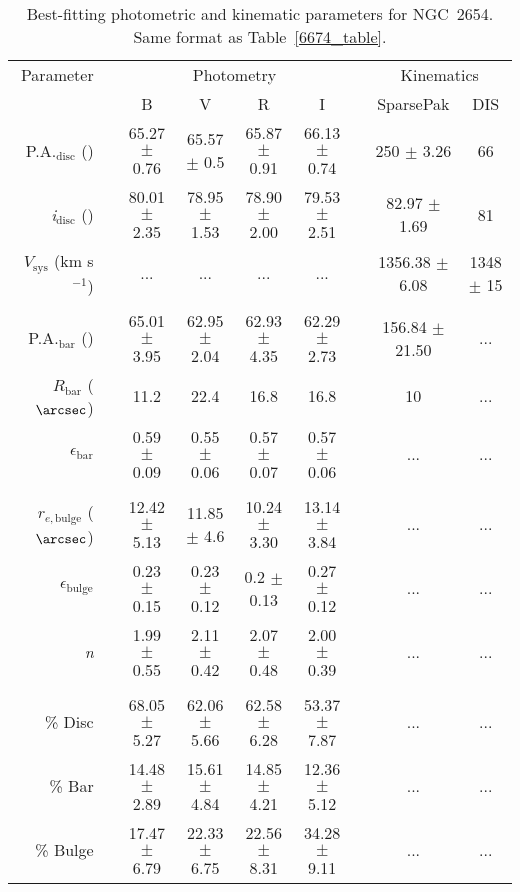 \documentclass[a4paper,fleqn,usenatbib]{mnras}
\begin{document}
\begin{table*}
	\centering
	\caption{Best-fitting photometric and kinematic parameters for NGC~2654. Same format as Table~\ref{6674_table}.}
	\label{2654_table}
	\begin{tabular}{rcccccccc}
		\hline
		Parameter		&		&\multicolumn{4}{c}{Photometry}		&		&\multicolumn{2}{c}{Kinematics}\\
							\cline{3-6}									\cline{8-9}
					&		&B		&V		&R		&I		&		&SparsePak		&DIS\\
		\hline
	P.A.$_{\mathrm{disc}}$ (\degr) & & 65.27 $\pm$ 0.76 & 65.57 $\pm$ 0.5 & 65.87 $\pm$ 0.91 & 66.13 $\pm$ 0.74 & & 250 $\pm$ 3.26 & 66 \\
	\textit{i}$_{\mathrm{disc}}$ (\degr) & & 80.01 $\pm$ 2.35 & 78.95 $\pm$ 1.53 & 78.90 $\pm$ 2.00 & 79.53 $\pm$ 2.51 & & 82.97 $\pm$ 1.69 & 81  \\
	$V_{\mathrm{sys}}$ (km s$^{-1}$) & & ... & ... & ... & ... & & 1356.38 $\pm$ 6.08 & 1348 $\pm$ 15 \\
	\\
	P.A.$_{\mathrm{bar}}$ (\degr) & & 65.01 $\pm$ 3.95 & 62.95 $\pm$ 2.04 & 62.93 $\pm$ 4.35 & 62.29 $\pm$ 2.73 & & 156.84 $\pm$ 21.50 & ... \\
	$R_{\mathrm{bar}}$ ($\arcsec$) & & 11.2 & 22.4 & 16.8 & 16.8 & & 10 & ... \\
	$\epsilon_{\mathrm{bar}}$ & & 0.59 $\pm$ 0.09 & 0.55 $\pm$ 0.06 & 0.57 $\pm$ 0.07 & 0.57 $\pm$ 0.06 & & ... & ... \\
	\\
	$r_{e, \mathrm{bulge}}$ ($\arcsec$) & & 12.42 $\pm$ 5.13 & 11.85 $\pm$ 4.6 & 10.24 $\pm$ 3.30 & 13.14 $\pm$ 3.84 & & ... & ... \\
	$\epsilon_{\mathrm{bulge}}$ & & 0.23 $\pm$ 0.15 & 0.23 $\pm$ 0.12 & 0.2 $\pm$ 0.13 & 0.27 $\pm$ 0.12 & & ... & ... \\
	\textit{n} & & 1.99 $\pm$ 0.55 & 2.11 $\pm$ 0.42 & 2.07 $\pm$ 0.48 & 2.00 $\pm$ 0.39 & & ... & ... \\
	\\
	\% Disc & & 68.05 $\pm$ 5.27 & 62.06 $\pm$ 5.66 & 62.58 $\pm$ 6.28 & 53.37 $\pm$ 7.87 & & ... & ... \\
	\% Bar & & 14.48 $\pm$ 2.89 & 15.61 $\pm$ 4.84 & 14.85 $\pm$ 4.21 & 12.36 $\pm$ 5.12 & & ... & ... \\
	\% Bulge & & 17.47 $\pm$ 6.79 & 22.33 $\pm$ 6.75 & 22.56 $\pm$ 8.31 & 34.28 $\pm$ 9.11 & & ... & ... \\
	\hline
	\end{tabular}
\end{table*}
\end{document}
